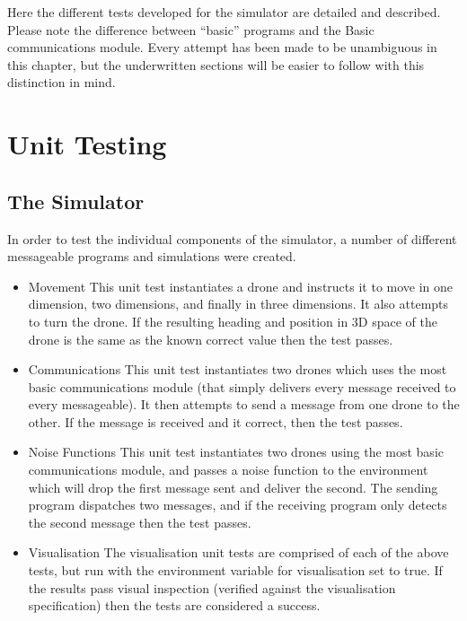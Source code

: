 Here the different tests developed for the simulator are detailed and described. Please note the difference between ``basic'' programs and the Basic communications module. Every attempt has been made to be unambiguous in this chapter, but the underwritten sections will be easier to follow with this distinction in mind.

\section{Unit Testing}

\subsection{The Simulator}
In order to test the individual components of the simulator, a number of different messageable programs and simulations were created.

\begin{itemize}
\item Movement
This unit test instantiates a drone and instructs it to move in one dimension, two dimensions, and finally in three dimensions. It also attempts to turn the drone. If the resulting heading and position in 3D space of the drone is the same as the known correct value then the test passes.

\item Communications
This unit test instantiates two drones which uses the most basic communications module (that simply delivers every message received to every messageable). It then attempts to send a message from one drone to the other. If the message is received and it correct, then the test passes.

\item Noise Functions
This unit test instantiates two drones using the most basic communications module, and passes a noise function to the environment which will drop the first message sent and deliver the second. The sending program dispatches two messages, and if the receiving program only detects the second message then the test passes.

\item Visualisation
The visualisation unit tests are comprised of each of the above tests, but run with the environment variable for visualisation set to true. If the results pass visual inspection (verified against the visualisation specification) then the tests are considered a success.
\end{itemize}

